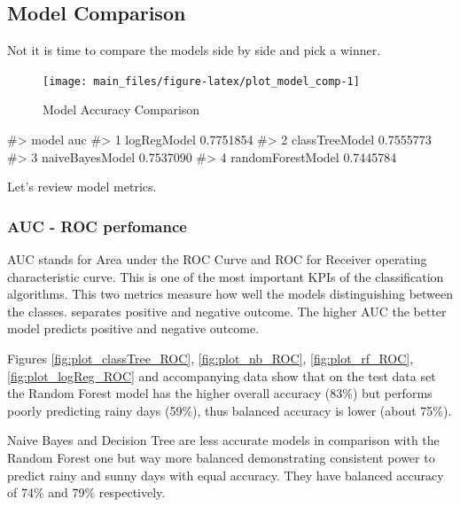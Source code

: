 \hypertarget{model-comparison}{%
\subsection{Model Comparison}\label{model-comparison}}

Not it is time to compare the models side by side and pick a winner.

\begin{Schunk}
\begin{figure}[H]

{\centering \texttt{[image: main\_files/figure-latex/plot\_model\_comp-1]} 

}

\caption[Model Accuracy Comparison]{Model Accuracy Comparison}\label{fig:plot_model_comp}
\end{figure}
\begin{Soutput}
#>               model       auc
#> 1       logRegModel 0.7751854
#> 2    classTreeModel 0.7555773
#> 3   naiveBayesModel 0.7537090
#> 4 randomForestModel 0.7445784
\end{Soutput}
\end{Schunk}

Let's review model metrics.

\hypertarget{auc---roc-perfomance}{%
\subsubsection{AUC - ROC perfomance}\label{auc---roc-perfomance}}

AUC stands for Area under the ROC Curve and ROC for Receiver operating
characteristic curve. This is one of the most important KPIs of the
classification algorithms. This two metrics measure how well the models
distinguishing between the classes. separates positive and negative
outcome. The higher AUC the better model predicts positive and negative
outcome.

Figures \ref{fig:plot_classTree_ROC}, \ref{fig:plot_nb_ROC},
\ref{fig:plot_rf_ROC}, \ref{fig:plot_logReg_ROC} and accompanying data
show that on the test data set the Random Forest model has the higher
overall accuracy (83\%) but performs poorly predicting rainy days
(59\%), thus balanced accuracy is lower (about 75\%).

Naive Bayes and Decision Tree are less accurate models in comparison
with the Random Forest one but way more balanced demonstrating
consistent power to predict rainy and sunny days with equal accuracy.
They have balanced accuracy of 74\% and 79\% respectively.

